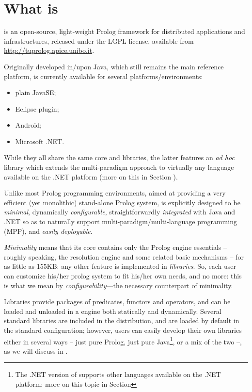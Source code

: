 \chapter{What is \tuprolog{}}
\label{what-is}

\tuprolog{} is an open-source, light-weight Prolog framework for distributed applications and infrastructures, released under the LGPL license, available from \url{http://tuprolog.apice.unibo.it}.

Originally developed in/upon Java, which still remains the main reference platform,
\tuprolog{} is currently available for several platforms/environments:
\begin{itemize}
  \item plain JavaSE;
  \item Eclipse plugin;
  \item Android;
  \item Microsoft .NET.
\end{itemize}
%
While they all share the same core and libraries, the latter features an \emph{ad hoc} library which extends the multi-paradigm approach to virtually any language available on the .NET platform (more on this in Section ).

Unlike most Prolog programming environments, aimed at providing a very efficient (yet monolithic) stand-alone Prolog system, \tuprolog{} is explicitly designed to be \emph{minimal}, dynamically \emph{configurable}, straightforwardly \emph{integrated} with Java and .NET so as to naturally support multi-paradigm/multi-language programming (MPP), and \emph{easily deployable}.

\textit{Minimality} means that its core contains only the Prolog engine essentials -- roughly speaking, the resolution engine and some related basic mechanisms -- for as little as 155KB: any other feature is implemented in \textit{libraries}.
%
So, each user can customize his/her prolog system to fit his/her own needs, and no more:
this is what we mean by \tuprolog{} \textit{configurability}---the necessary counterpart of minimality.

Libraries provide packages of predicates, functors and operators, and can be loaded and unloaded in a \tuprolog{} engine both statically and dynamically.
%
Several standard libraries are included in the \tuprolog{} distribution, and are loaded by default in the standard \tuprolog{} configuration; however, users can easily develop their own libraries either in several ways -- just pure Prolog, just pure Java\footnote{The .NET version of \tuprolog{} supports other languages available on the .NET platform: more on this topic in Section }, or a mix of the two --, as we will discuss in .


